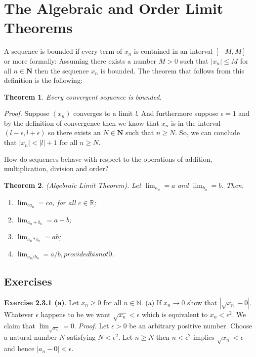 \documentclass[10pt]{amsbook}
\newtheorem{theorem}{Theorem}
\begin{document}
\section{The Algebraic and Order Limit Theorems}
A sequence is bounded if every term of $x_{n}$ is contained in an interval $\left[-M, M\right]$ or more formally: Assuming there exists a number $M > 0$ such that $\left|x_{n}\right| \le M$ for all $n \in \mathbf{N}$ then the sequence $x_{n}$ is bounded. The theorem that follows from this definition is the following: 
\begin{theorem}
\textit{Every convergent sequence is bounded.}
\end{theorem}
\textit{Proof.} Suppose $\left(x_{n}\right)$ converges to a limit \textit{l}. And furthermore suppose $\epsilon = 1$ and by the definition of convergence then we know that $x_{n}$ is in the interval 
$\left(l-\epsilon, l+\epsilon\right)$ so there exists an $N \in \mathbf{N}$ such that $n \ge N$. So, we can conclude that $\left|x_{n}\right| < \left|l\right| + 1$ for all $n \ge N$.

How do sequences behave with respect to the operations of addition, multiplication, division and order?

\begin{theorem}
    (Algebraic Limit Theorem).
    Let $\lim_{a_{n}} = a$ and $\lim_{b_{n}} = b$. Then,
    \begin{enumerate}[label=(\roman*)]
    \item $\lim_{ca_{n}} = ca$, for all $c \in \mathbb{R}$;
    \item $\lim_{a_{n} + b_{n}} = a + b$;
    \item $\lim_{a_{n} * b_{n}} = ab$;
    \item $\lim_{a_{n}/b_{n}} = a/b, provided b is not 0$.
    \end{enumerate}
\end{theorem}
\subsection{Exercises}
\textbf{Exercise 2.3.1 (a)}. 
Let $x_{n} \ge 0$ for all $n \in \mathbb{N}$. (a) If $x_{n} \to 0$
show that $\left|\sqrt{x_{n}} - 0\right|$. Whatever $\epsilon$ happens to be we want $\sqrt{x_{n}} < \epsilon$ which is equivalent to $x_{n} < \epsilon^2$. We claim that $\lim_{\sqrt{x_{n}}} = 0$. \textit{Proof.} Let $\epsilon > 0$ be an arbitrary positive number. Choose a natural number  $N$ satisfying  $N < \epsilon^2$. Let $n \ge N$ then $n < \epsilon^2$ implies $\sqrt{x_{n}} < \epsilon$ and hence $\left|a_{n} - 0\right| < \epsilon$.
\end{document}
